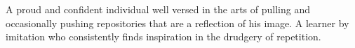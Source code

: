 \documentclass[10pt]{article}
\begin{document}
%
\begin{center}
\begin{minipage}{0.92\textwidth}
	\raggedright
		\normalsize{A proud and confident individual well versed in the arts of pulling and occasionally pushing repositories that are a reflection of his image. A learner by imitation who consistently finds inspiration in the drudgery of repetition.}
\end{minipage}
\end{center}


\end{document}
